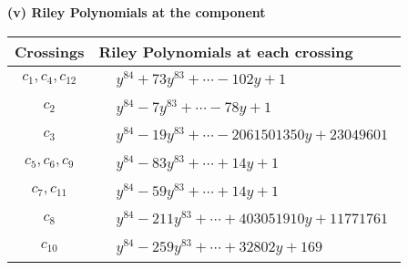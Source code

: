 \documentclass[1p]{elsarticle_modified}
\theoremstyle{definition}
\begin{document}
\flushleft \textbf{(v) Riley Polynomials at the component}\newline \\
\begin{tabular}{m{50pt}|m{274pt}}
Crossings & \hspace{64pt}Riley Polynomials at each crossing \\
\hline $$\begin{aligned}c_{1},c_{4},c_{12}\end{aligned}$$&$\begin{aligned}
&y^{84}+73 y^{83}+\cdots-102 y+1
\end{aligned}$\\
\hline $$\begin{aligned}c_{2}\end{aligned}$$&$\begin{aligned}
&y^{84}-7 y^{83}+\cdots-78 y+1
\end{aligned}$\\
\hline $$\begin{aligned}c_{3}\end{aligned}$$&$\begin{aligned}
&y^{84}-19 y^{83}+\cdots-2061501350 y+23049601
\end{aligned}$\\
\hline $$\begin{aligned}c_{5},c_{6},c_{9}\end{aligned}$$&$\begin{aligned}
&y^{84}-83 y^{83}+\cdots+14 y+1
\end{aligned}$\\
\hline $$\begin{aligned}c_{7},c_{11}\end{aligned}$$&$\begin{aligned}
&y^{84}-59 y^{83}+\cdots+14 y+1
\end{aligned}$\\
\hline $$\begin{aligned}c_{8}\end{aligned}$$&$\begin{aligned}
&y^{84}-211 y^{83}+\cdots+403051910 y+11771761
\end{aligned}$\\
\hline $$\begin{aligned}c_{10}\end{aligned}$$&$\begin{aligned}
&y^{84}-259 y^{83}+\cdots+32802 y+169
\end{aligned}$\\
\hline
\end{tabular}\\~\\
\end{document}
